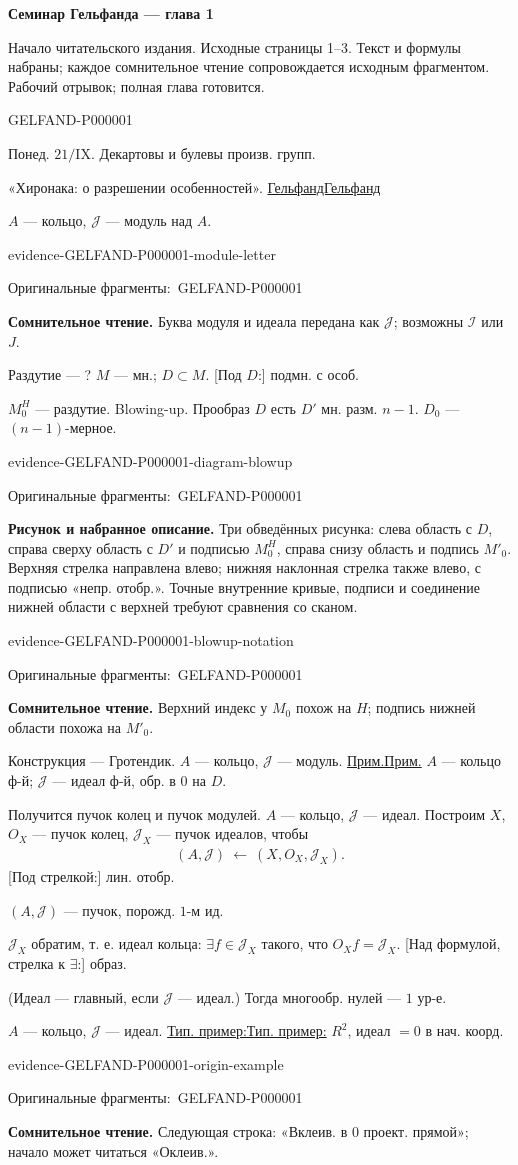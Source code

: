 \documentclass[11pt]{article}
\let\MathUnderline\underline
\renewcommand{\underline}[1]{\ifmmode\MathUnderline{#1}\else\uline{#1}\fi}
\newcommand{\SourcePage}[2]{\par\smallskip\phantomsection\label{#1:source-page}{\small\sffamily\color{blue!55!black}#1}\par\smallskip}
\newcommand{\EvidenceBlock}[4]{%
 \par\smallskip\noindent\begin{minipage}{\linewidth}
 \begin{minipage}[t]{.47\linewidth}\vspace{0pt}\centering
 \csname evidence-#1-#2\endcsname\par
 {\scriptsize\SourceCropCaption\ #1}\par
 \end{minipage}\hfill
 \begin{minipage}[t]{.49\linewidth}\vspace{0pt}\raggedright
 {\small\color{orange!65!black}\textbf{#4} #3}\par
 \end{minipage}
 \end{minipage}\par\smallskip}
\newcommand{\Unclear}[3]{\EvidenceBlock{#1}{#2}{#3}{\ReadingCaption}}
\newcommand{\SourceFigure}[3]{\EvidenceBlock{#1}{#2}{#3}{\DiagramCaption}}
\newcommand{\SourceCropCaption}{Оригинальные фрагменты:}\newcommand{\ReadingCaption}{Сомнительное чтение.}\newcommand{\IncompleteCaption}{Неразобранный фрагмент.}\newcommand{\DiagramCaption}{Рисунок и набранное описание.}
\begin{document}
{\large\bfseries Семинар Гельфанда — глава 1}\par
{\small Начало читательского издания. Исходные страницы 1–3. Текст и формулы набраны; каждое сомнительное чтение сопровождается исходным фрагментом. Рабочий отрывок; полная глава готовится.}\par\medskip
\SourcePage{GELFAND-P000001}{unlabelled}
Понед. $21/\mathrm{IX}$.
Декартовы и булевы произв. групп.

«Хиронака: о разрешении особенностей».
\underline{Гельфанд}

$A$ — кольцо, $\mathcal{J}$ — модуль над $A$.
\Unclear{GELFAND-P000001}{module-letter}{Буква модуля и идеала передана как $\mathcal{J}$; возможны $\mathcal{I}$ или $J$.}

Раздутие — ?
$M$ — мн.; $D\subset M$.
[Под $D$:] подмн. с особ.

$M_0^H$ — раздутие. Blowing-up.
Прообраз $D$ есть $D'$ мн. разм. $n-1$.
$D_0$ — $(n-1)$-мерное.
\SourceFigure{GELFAND-P000001}{diagram-blowup}{Три обведённых рисунка: слева область с $D$, справа сверху область с $D'$ и подписью $M_0^H$, справа снизу область и подпись $M'_0$. Верхняя стрелка направлена влево; нижняя наклонная стрелка также влево, с подписью «непр. отобр.». Точные внутренние кривые, подписи и соединение нижней области с верхней требуют сравнения со сканом.}
\Unclear{GELFAND-P000001}{blowup-notation}{Верхний индекс у $M_0$ похож на $H$; подпись нижней области похожа на $M'_0$.}

Конструкция — Гротендик.
$A$ — кольцо, $\mathcal{J}$ — модуль.
\underline{Прим.} $A$ — кольцо ф-й;
$\mathcal{J}$ — идеал ф-й, обр. в $0$ на $D$.

Получится пучок колец и пучок модулей.
$A$ — кольцо, $\mathcal{J}$ — идеал.
Построим $X$, $O_X$ — пучок колец,
$\mathcal{J}_X$ — пучок идеалов, чтобы
\begin{gather*}
 (A,\mathcal{J})\ \longleftarrow\ (X,O_X,\mathcal{J}_X).
\end{gather*}
[Под стрелкой:] лин. отобр.

$(A,\mathcal{J})$ — пучок, порожд. $1$-м ид.

$\mathcal{J}_X$ обратим, т. е. идеал кольца:
$\exists f\in\mathcal{J}_X$ такого, что $O_Xf=\mathcal{J}_X$.
[Над формулой, стрелка к $\exists$:] образ.

(Идеал — главный, если $\mathcal{J}$ — идеал.)
Тогда многообр. нулей — $1$ ур-е.

$A$ — кольцо, $\mathcal{J}$ — идеал.
\underline{Тип. пример:} $R^2$, идеал $=0$ в нач. коорд.
\Unclear{GELFAND-P000001}{origin-example}{Следующая строка: «Вклеив. в $0$ проект. прямой»; начало может читаться «Оклеив.».}
\end{document}
